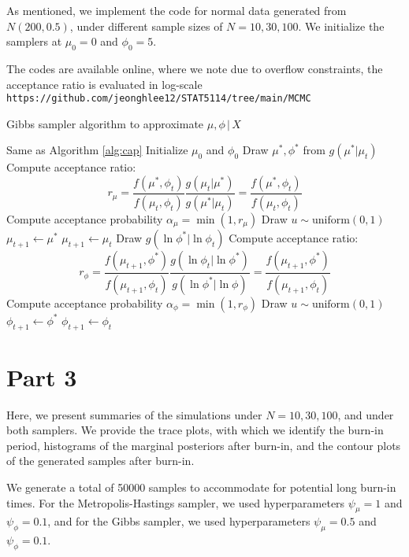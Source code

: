 \documentclass[12pt]{article}
\begin{document}
As mentioned, we implement the code for normal data generated from \(N(200, 0.5)\), under different sample sizes of \(N=10,30,100\). We initialize the samplers at \(\mu_0=0\) and \(\phi_0=5\).

The codes are available online, where we note due to overflow constraints, the acceptance ratio is evaluated in log-scale \texttt{https://github.com/jeonghlee12/STAT5114/tree/main/MCMC}

\begin{algorithm}[t]
\caption{Gibbs sampler algorithm to approximate \(\mu,\phi\,|\,X\)}\label{alg:cap2}
\begin{algorithmic}[1]
\Require Same as Algorithm \ref{alg:cap}
\State Initialize \(\mu_0\) and \(\phi_0\)
    \State Draw \(\mu^\ast,\phi^\ast\) from \(g(\mu^\ast|\mu_t)\)
    \State Compute acceptance ratio:
    \[r_\mu=\frac{f(\mu^\ast,\phi_t)}{f(\mu_t,\phi_t)}\frac{g(\mu_t|\mu^\ast)}{g(\mu^\ast|\mu_t)}=\frac{f(\mu^\ast,\phi_t)}{f(\mu_t,\phi_t)}\]
    \State Compute acceptance probability \(\alpha_\mu=\min(1, r_\mu)\)
    \State Draw \(u\sim\text{uniform}(0,1)\)
        \State \(\mu_{t+1}\gets\mu^\ast\)
        \State \(\mu_{t+1}\gets\mu_t\)
    \EndIf
    \State Draw \(g(\ln\phi^\ast|\ln\phi_t)\)
    \State Compute acceptance ratio:
    \[r_\phi=\frac{f(\mu_{t+1},\phi^\ast)}{f(\mu_{t+1},\phi_t)}\frac{g(\ln\phi_t|\ln\phi^\ast)}{g(\ln\phi^\ast|\ln\phi)}=\frac{f(\mu_{t+1},\phi^\ast)}{f(\mu_{t+1},\phi_t)}\]
    \State Compute acceptance probability \(\alpha_\phi=\min(1, r_\phi)\)
    \State Draw \(u\sim\text{uniform}(0,1)\)
        \State \(\phi_{t+1}\gets\phi^\ast\)
        \State \(\phi_{t+1}\gets\phi_t\)
    \EndIf
\EndFor
\end{algorithmic}
\end{algorithm}

\section*{Part 3}

Here, we present summaries of the simulations under \(N=10,30,100\), and under both samplers. We provide the trace plots, with which we identify the burn-in period, histograms of the marginal posteriors after burn-in, and the contour plots of the generated samples after burn-in.

We generate a total of 50000 samples to accommodate for potential long burn-in times. For the Metropolis-Hastings sampler, we used hyperparameters \(\psi_\mu=1\) and \(\psi_\phi=0.1\), and for the Gibbs sampler, we used hyperparameters \(\psi_\mu=0.5\) and \(\psi_\phi=0.1\).
\newpage
\end{document}
